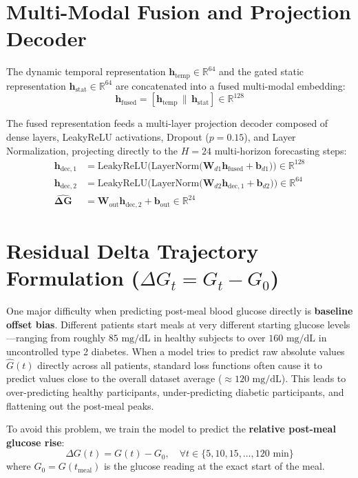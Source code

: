 \section{Multi-Modal Fusion and Projection Decoder}
The dynamic temporal representation $\mathbf{h}_{\text{temp}} \in \mathbb{R}^{64}$ and the gated static representation $\mathbf{h}_{\text{stat}} \in \mathbb{R}^{64}$ are concatenated into a fused multi-modal embedding:
\begin{equation}
    \mathbf{h}_{\text{fused}} = [\mathbf{h}_{\text{temp}} \,\|\, \mathbf{h}_{\text{stat}}] \in \mathbb{R}^{128}
\end{equation}

The fused representation feeds a multi-layer projection decoder composed of dense layers, LeakyReLU activations, Dropout ($p=0.15$), and Layer Normalization, projecting directly to the $H = 24$ multi-horizon forecasting steps:
\begin{align}
    \mathbf{h}_{\text{dec}, 1} &= \text{LeakyReLU}\Big(\text{LayerNorm}\big(\mathbf{W}_{d1} \mathbf{h}_{\text{fused}} + \mathbf{b}_{d1}\big)\Big) \in \mathbb{R}^{128} \\
    \mathbf{h}_{\text{dec}, 2} &= \text{LeakyReLU}\Big(\text{LayerNorm}\big(\mathbf{W}_{d2} \mathbf{h}_{\text{dec}, 1} + \mathbf{b}_{d2}\big)\Big) \in \mathbb{R}^{64} \\
    \hat{\boldsymbol{\Delta \mathbf{G}}} &= \mathbf{W}_{\text{out}} \mathbf{h}_{\text{dec}, 2} + \mathbf{b}_{\text{out}} \in \mathbb{R}^{24}
\end{align}

\section{Residual Delta Trajectory Formulation ($\Delta G_t = G_t - G_0$)}
One major difficulty when predicting post-meal blood glucose directly is \textbf{baseline offset bias}. Different patients start meals at very different starting glucose levels—ranging from roughly $85\text{ mg/dL}$ in healthy subjects to over $160\text{ mg/dL}$ in uncontrolled type 2 diabetes. When a model tries to predict raw absolute values $\hat{G}(t)$ directly across all patients, standard loss functions often cause it to predict values close to the overall dataset average ($\approx 120\text{ mg/dL}$). This leads to over-predicting healthy participants, under-predicting diabetic participants, and flattening out the post-meal peaks.

To avoid this problem, we train the model to predict the \textbf{relative post-meal glucose rise}:
\begin{equation}
    \Delta G(t) = G(t) - G_0, \quad \forall t \in \{5, 10, 15, \dots, 120\text{ min}\}
\end{equation}
where $G_0 = G(t_{\text{meal}})$ is the glucose reading at the exact start of the meal.

